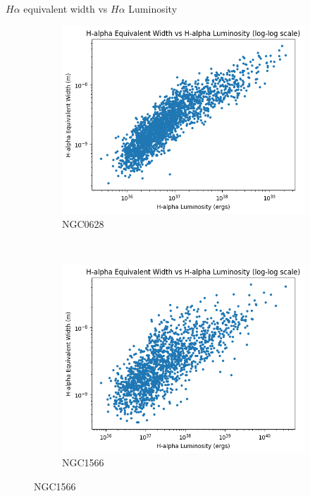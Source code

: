 \documentclass{beamer}
\begin{document}
\begin{frame}{$H\alpha$ equivalent width vs $H\alpha$ Luminosity}
    \begin{figure}
        \centering
        \begin{subfigure}{0.45\textwidth}
            \includegraphics[scale = 0.25]{image36.png}
            \caption{NGC0628}
        \end{subfigure}
        ~
        \begin{subfigure}{0.45\textwidth}
                \includegraphics[scale = 0.25]{image34.png}
                \caption{NGC1566}
                \label{fig:image6}
        \end{subfigure}
    \end{figure}


\end{frame}
\end{document}
